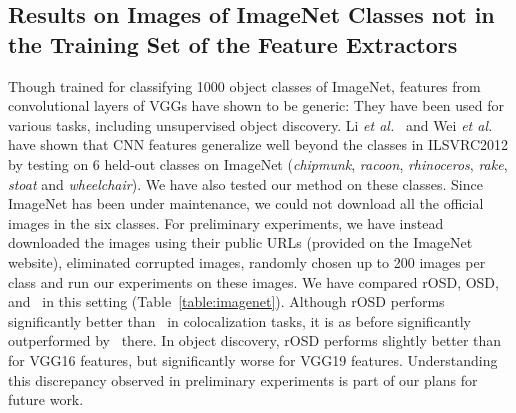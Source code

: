 \documentclass[runningheads]{llncs}
\begin{document}
\subsection{Results on Images of ImageNet Classes not in the Training Set of the Feature Extractors}
Though trained for classifying 1000 object classes of ImageNet, features from convolutional layers of VGGs have shown to be generic: They have been used for various tasks, including unsupervised object discovery. Li {\em et al.}~\cite{Li2016mimick} and Wei {\em et al.}~\cite{Wei2019ddtplus} have shown that CNN features generalize well beyond the classes in ILSVRC2012 by testing on 6 held-out classes on ImageNet (\textit{chipmunk}, \textit{racoon}, \textit{rhinoceros}, \textit{rake}, \textit{stoat} and \textit{wheelchair}). We have also tested our method on these classes. Since ImageNet has been under maintenance, we could not download all the official images in the six classes. For preliminary experiments, we have instead downloaded the images using their public URLs (provided on the ImageNet website), eliminated corrupted images, randomly chosen up to 200 images per class and run our experiments on these images. We have compared rOSD, OSD,~\cite{Li2016mimick} and~\cite{Wei2019ddtplus} in this setting (Table~\ref{table:imagenet}). Although rOSD performs significantly better than~\cite{Li2016mimick} in colocalization tasks, it is as before significantly outperformed by~\cite{Wei2019ddtplus} there.  In object discovery, rOSD performs slightly better than~\cite{Wei2019ddtplus} for VGG16 features, but significantly worse for VGG19 features. Understanding this discrepancy observed in preliminary experiments is part of our plans for future work.
\end{document}
